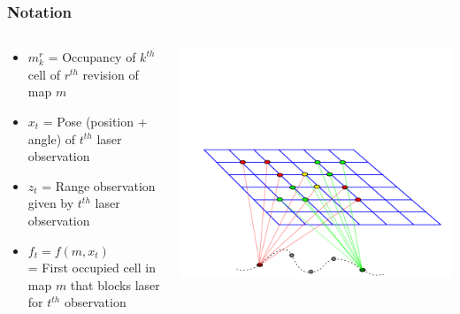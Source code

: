 \documentclass{beamer}
\begin{document}
\begin{frame}
\frametitle{Notation}
\begin{columns}
  \begin{column}{0.7\textwidth}
    \begin{itemize}
      \item $m^r_k$ = Occupancy of $k^{th}$ cell of $r^{th}$ revision of map $m$
      \item $x_t$ = Pose (position + angle) of $t^{th}$ laser observation
      \item $z_t$ = Range observation given by $t^{th}$ laser observation
      \item $f_t = f(m, x_t)$\\
        = First occupied cell in map $m$ that blocks laser for $t^{th}$ observation
    \end{itemize}
  \end{column}
  \begin{column}{0.3\textwidth}
    \includegraphics[trim=0in 0in 0in 2in, width=\textwidth]{figures/factorgraph/fg3.pdf}
  \end{column}
\end{columns}
\end{frame}
\end{document}
